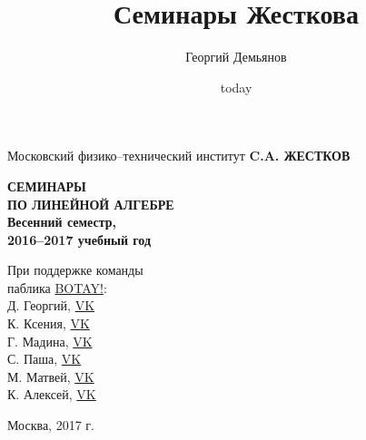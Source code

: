 \documentclass[a4paper, 12pt, openany]{book}
\title{Семинары Жесткова}
\author{Георгий Демьянов}
\date{today}
\begin{document}
\def\chaptername{Семинар} %
\setcounter{tocdepth}{1} %


\begin{titlepage}
	\begin{center}
		{\large Московский физико--технический институт}
		\vfill
		\vfill
		{\Large \textbf{C.A. ЖЕСТКОВ}}
		\vspace{1.5cm}
		
		
		{\textbf{{\Huge СЕМИНАРЫ\\\smallskip ПО ЛИНЕЙНОЙ АЛГЕБРЕ}\\ \Large Весенний семестр,\\ 2016--2017 учебный год}}
		\bigskip
	\end{center}
	\vfill
	
	\hfill\begin{minipage}{0.4\textwidth}
		{\centering
				При поддержке команды\\ паблика \href{https://vk.com/botay_fizteh}{BOTAY!}:\\
				Д. Георгий, \href{https://vk.com/id37346992}{VK}\\
				К. Ксения, \href{https://vk.com/id143862366}{VK}\\
				Г. Мадина, \href{https://vk.com/id226312463}{VK}\\
				С. Паша, \href{https://vk.com/id181006282}{VK}\\
				М. Матвей, \href{https://vk.com/id62009425}{VK}\\
				К. Алексей, \href{https://vk.com/id92540660}{VK}\\	
			}
	\end{minipage}%

	\vfill
	\begin{center}
		Москва, 2017 г.
	\end{center}
\end{titlepage}

\pagestyle{plain1}
{
\tableofcontents
}

\newpage %
\end{document}
